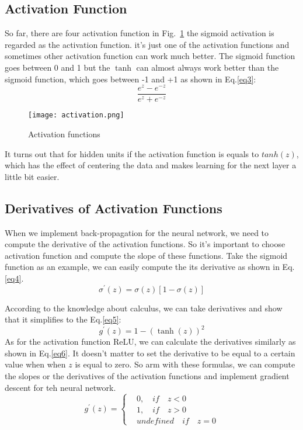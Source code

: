 \documentclass[a4paper]{article}
\begin{document}
\subsection{Activation Function}
So far, there are four activation function in Fig.~\ref{activation} the sigmoid activation is regarded as the activation function.
it's just one of the activation functions and sometimes other activation function can work much better. The sigmoid function goes between 0 and 1 but the $\tanh$ can almost always work better than the
sigmoid function, which goes between -1 and +1 as shown in Eq.\ref{eq3}:
\begin{equation}
 \frac{e^z-e^{-z}}{e^z+e^{-z}}
 \label{eq3}
\end{equation}
%
\begin{figure}[h]
	\centering
	\texttt{[image: activation.png]}
	\caption{Activation functions}
	\label{activation}
\end{figure}
%
It turns out that for hidden units if the activation function is equals to $tanh\left(z\right)$, which has the effect of centering the data and makes learning for the next layer a little bit easier.
\subsection{Derivatives of Activation Functions}
When we implement back-propagation for the neural network, we
need to compute the derivative of the activation functions. So 
it's important to choose activation function and compute the 
slope of these functions. Take the sigmoid function as an example, we can easily compute the its derivative as shown in Eq.\ref{eq4}.
\begin{equation}
   \sigma^\prime\left(z\right) = \sigma\left(z\right)\left[1-\sigma\left(z\right)\right]
   \label{eq4}
\end{equation}
\par
According to the knowledge about calculus, we can take derivatives and show that it simplifies to the Eq.\ref{eq5}:
\begin{equation}
  g^\prime \left(z\right) = 1-\left(\tanh\left(z\right)\right)^2 
  \label{eq5}
\end{equation}
As for the activation function ReLU, we can calculate the derivatives similarly  as shown in Eq.\ref{eq6}. It doesn't 
matter to set the derivative to be equal to a certain value 
when when $z$ is equal to zero. So arm with these formulas, we
can compute the slopes or the derivatives of the activation functions and implement gradient descent for teh neural network.
\begin{equation}
	g^\prime\left(z\right) =\left\{
	  \begin{aligned}
	   & 0,\quad if \quad z < 0 \\
	   & 1, \quad if \quad z > 0 \\
	   & undefined \quad if \quad z = 0
	  \end{aligned}
	  \right.
	  \label{eq6}
\end{equation}
\end{document}
